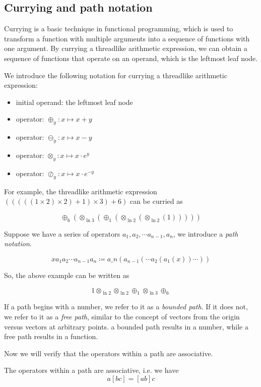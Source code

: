 \subsection{Currying and path notation}\label{subsec:currying}

Currying is a basic technique in functional programming\cite{Reynolds1972DefinitionalIF},
which is used to transform a function with multiple arguments into a sequence of functions with one argument.
By currying a threadlike arithmetic expression, we can obtain a sequence of functions that operate on an operand, which is the leftmost leaf node.

We introduce the following notation for currying a threadlike arithmetic expression:
\begin{itemize}
    \item initial operand: the leftmost leaf node
    \item operator: $\oplus_y: x \mapsto x + y$
    \item operator: $\ominus_y: x \mapsto x - y$
    \item operator: $\otimes_y: x \mapsto x \cdot e^y$
    \item operator: $\oslash_y: x \mapsto x \cdot e^{-y}$
\end{itemize}

For example, the threadlike arithmetic expression $(((((1 \times 2) \times 2) + 1) \times 3) + 6)$ can be curried as

\[\oplus_6(\otimes_{\ln 3}(\oplus_1(\otimes_{\ln 2}(\otimes_{\ln 2}(1)))))\]

Suppose we have a series of operators $a_1, a_2, \cdots a_{n-1}, a_n$, we introduce a \emph{path notation}.

\[x a_1 a_2 \cdots a_{n-1} a_n \coloneqq a\_n( a_{n-1}( \cdots a_2( a_1(x) ) \cdots ) )\]

So, the above example can be written as

\[1 \otimes_{\ln 2} \otimes_{\ln 2} \oplus_1 \otimes_{\ln 3} \oplus_6 \]

If a path begins with a number, we refer to it as a \emph{bounded path}.
If it does not, we refer to it as a \emph{free path}, similar to the concept of vectors from the origin versus vectors at arbitrary points.
a bounded path results in a number, while a free path results in a function.

Now we will verify that the operators within a path are associative.

\begin{lemma}\label{lemma:associative}
    The operators within a path are associative, i.e. we have \[a [b c] = [a b] c\]
\end{lemma}

